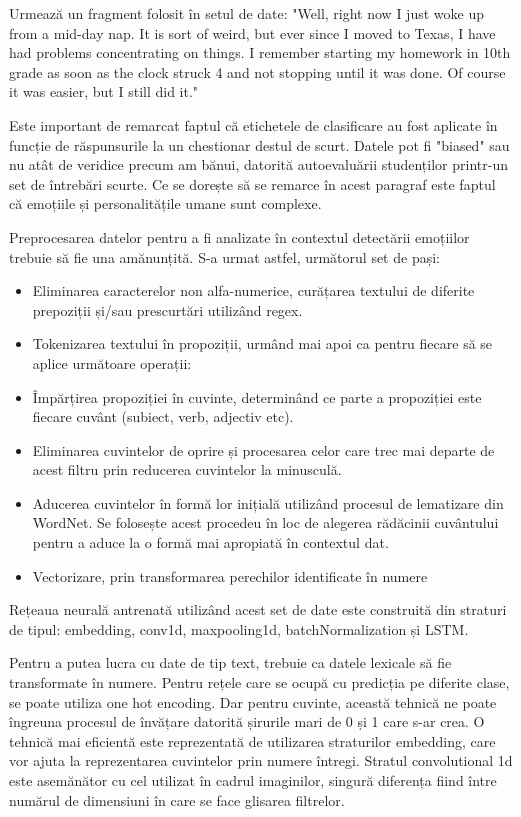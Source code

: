 \documentclass[a4paper, 12pt]{report}
\begin{document}
	Urmează un fragment folosit în setul de date: "Well, right now I just woke up from a mid-day nap. It is sort of weird, but ever since I moved to Texas, I have had problems concentrating on things. I remember starting my homework in 10th grade as soon as the clock struck 4 and not stopping until it was done. Of course it was easier, but I still did it."
	
	Este important de remarcat faptul că etichetele de clasificare au fost aplicate în funcție de răspunsurile la un chestionar destul de scurt. Datele pot fi "biased" sau nu atât de veridice precum am bănui, datorită autoevaluării studenților printr-un set de întrebări scurte. Ce se dorește să se remarce în acest paragraf este faptul că emoțiile și personalitățile umane sunt complexe.
	
	Preprocesarea datelor pentru a fi analizate în contextul detectării emoțiilor trebuie să fie una amănunțită. S-a urmat astfel, următorul set de pași:
	\begin{itemize}
		\item Eliminarea caracterelor non alfa-numerice, curățarea textului de diferite prepoziții și/sau prescurtări utilizând regex.
		\item Tokenizarea textului în propoziții, urmând mai apoi ca pentru fiecare să se aplice următoare operații:
		\item Împărțirea propoziției în cuvinte, determinând ce parte a propoziției este fiecare cuvânt (subiect, verb, adjectiv etc).
		\item Eliminarea cuvintelor de oprire și procesarea celor care trec mai departe de acest filtru prin reducerea cuvintelor la minusculă.
		\item Aducerea cuvintelor în formă lor inițială utilizând procesul de lematizare din WordNet. Se folosește acest procedeu în loc de alegerea rădăcinii cuvântului pentru a aduce la o formă mai apropiată în contextul dat.
		\item Vectorizare, prin transformarea perechilor identificate în numere
	\end{itemize}
	
	\bigskip
	
 	Rețeaua neurală antrenată utilizând acest set de date este construită din straturi de tipul: embedding, conv1d, maxpooling1d, batchNormalization și LSTM.

	Pentru a putea lucra cu date de tip text, trebuie ca datele lexicale să fie transformate în numere. Pentru rețele care se ocupă cu predicția pe diferite clase, se poate utiliza one hot encoding. Dar pentru cuvinte, această tehnică ne poate îngreuna procesul de învățare datorită șirurile mari de 0 și 1 care s-ar crea. O tehnică mai eficientă este reprezentată de utilizarea straturilor embedding, care vor ajuta la reprezentarea cuvintelor prin numere întregi. Stratul convolutional 1d este asemănător cu cel utilizat în cadrul imaginilor, singură diferența fiind între numărul de dimensiuni în care se face glisarea filtrelor.
\end{document}
